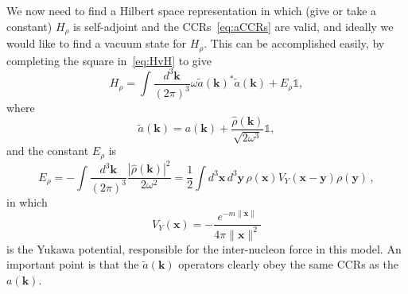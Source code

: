 \documentclass[12pt]{article}
\newcommand{\1}{\mathds{1}}                         %
\newcommand{\kb}{{\boldsymbol{k}}}
\newcommand{\xb}{{\boldsymbol{x}}}
\newcommand{\yb}{{\boldsymbol{y}}}
\begin{document}
	We now need to find a Hilbert space representation in which (give or take a constant) $H_\rho$ is
	self-adjoint and the CCRs~\eqref{eq:aCCRs} are valid, and ideally we would
	like to find a vacuum state for $H_\rho$. This can be accomplished easily,
	by completing the square in~\eqref{eq:HvH} to give
	\begin{equation}
	H_\rho = \int\frac{d^3\kb}{(2\pi)^3} \omega \tilde{a}(\kb)^*\tilde{a}(\kb) + E_\rho\mathbb{1},
	\end{equation}
	where
	\begin{equation}\label{eq:atilde}
	\tilde{a}(\kb) = a(\kb) + \frac{\hat{\rho}(\kb)}{\sqrt{2\omega^3}}\mathbb{1},
	\end{equation}
	and the constant $E_\rho$ is
	\begin{equation}
	E_\rho= -\int\frac{d^3\kb}{(2\pi)^3} \frac{|\hat{\rho}(\kb)|^2}{2\omega^2} = \frac{1}{2}\int d^3\xb\, d^3\yb\,\rho(\xb) V_Y(\xb-\yb)\rho(\yb) \,, 
	\end{equation} 
	in which 
	\[
	V_Y(\xb)=-\frac{e^{-m\|\xb\|}}{4\pi\|\xb\|^2}
	\]
	is the Yukawa potential, responsible for the inter-nucleon force in this model. An important point is that the $\tilde{a}(\kb)$ operators clearly obey
	the same CCRs as the $a(\kb)$.
	
\end{document}
